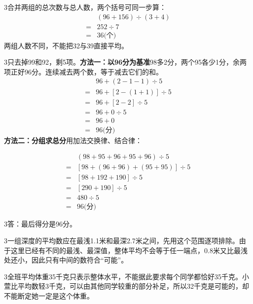 \documentclass[multi=snippet,border={5bp 20bp 5bp 5bp}]{standalone}
\newenvironment{snippet}[3]{\begin{minipage}{#1bp}\color{answerred}\fontsize{#2}{#3}\selectfont\raggedright}{\end{minipage}}
\begin{document}
\begin{snippet}{505}{11.5}{14}\begin{multicols}{3}\raggedcolumns 合并两组的总次数与总人数，两个括号可同一步算：\[\begin{aligned}&(96+156)\div(3+4)\\={}&252\div7\\={}&36\text{(个)}\end{aligned}\]两组人数不同，不能把32与39直接平均。\end{multicols}\end{snippet}
\begin{snippet}{505}{11.5}{14}\begin{multicols}{3}\raggedcolumns 只去掉99和92，剩5项。\textbf{方法一：以96分为基准}98多2分，两个95各少1分，余两项正好96分。连续减去两个数，等于减去它们的和。\[\begin{aligned}&96+(2-1-1)\div5\\={}&96+[2-(1+1)]\div5\\={}&96+[2-2]\div5\\={}&96+0\div5\\={}&96+0\\={}&96\text{(分)}\end{aligned}\]\textbf{方法二：分组求总分}用加法交换律、结合律：\end{multicols}\[\begin{aligned}&(98+95+96+95+96)\div5\\={}&[98+(96+96)+(95+95)]\div5\\={}&[98+192+190]\div5\\={}&[290+190]\div5\\={}&480\div5\\={}&96\text{(分)}\end{aligned}\]\begin{multicols}{3}\raggedcolumns 答：最后得分是96分。\end{multicols}\end{snippet}
\begin{snippet}{505}{11.5}{14}\begin{multicols}{3}\raggedcolumns 一组深度的平均数应在最浅1.1米和最深2.7米之间，先用这个范围逐项排除。由于这里已经有不同的最浅、最深值，整体平均不会等于任一端点，0.8米又比最浅处还小，因此只有中间的数符合“可能”。\end{multicols}\end{snippet}
\begin{snippet}{505}{11.5}{14}\begin{multicols}{3}\raggedcolumns 全班平均体重35千克只表示整体水平，不能据此要求每个同学都恰好35千克。小萱比平均数轻3千克，可以由其他同学较重的部分补足，所以32千克是可能的，却不能断定她一定是这个体重。\end{multicols}\end{snippet}
\end{document}
